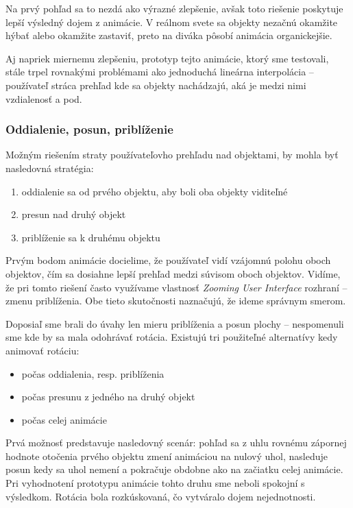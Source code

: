 Na prvý pohľad sa to nezdá ako výrazné zlepšenie, avšak toto riešenie poskytuje lepší výsledný dojem z animácie. V reálnom svete sa objekty nezačnú okamžite hýbať alebo okamžite zastaviť, preto na diváka pôsobí animácia organickejšie.

Aj napriek miernemu zlepšeniu, prototyp tejto animácie, ktorý sme testovali, stále trpel rovnakými problémami ako jednoduchá lineárna interpolácia -- používateľ stráca prehľad kde sa objekty nachádzajú, aká je medzi nimi vzdialenosť a pod.

\subsubsection{Oddialenie, posun, priblíženie}

Možným riešením straty používateľovho prehľadu nad objektami, by mohla byť nasledovná stratégia:

\begin{enumerate}
 \item oddialenie sa od prvého objektu, aby boli oba objekty viditeľné
 \item presun nad druhý objekt
 \item priblíženie sa k druhému objektu
\end{enumerate}

Prvým bodom animácie docielime, že používateľ vidí vzájomnú polohu oboch objektov, čím sa dosiahne lepší prehľad medzi súvisom oboch objektov. Vidíme, že pri tomto riešení často využívame vlastnosť \textit{Zooming User Interface} rozhraní -- zmenu priblíženia. Obe tieto skutočnosti naznačujú, že ideme správnym smerom.

Doposiaľ sme brali do úvahy len mieru priblíženia a posun plochy -- nespomenuli sme kde by sa mala odohrávať rotácia. Existujú tri použiteľné alternatívy kedy animovať rotáciu:

\begin{itemize}
 \item počas oddialenia, resp. priblíženia
 \item počas presunu z jedného na druhý objekt
 \item počas celej animácie
\end{itemize}

Prvá možnosť predstavuje nasledovný scenár: pohľad sa z uhlu rovnému zápornej hodnote otočenia prvého objektu zmení animáciou na nulový uhol, nasleduje posun kedy sa uhol nemení a pokračuje obdobne ako na začiatku celej animácie. Pri vyhodnotení prototypu animácie tohto druhu sme neboli spokojní s výsledkom. Rotácia bola rozkúskovaná, čo vytváralo dojem nejednotnosti.

